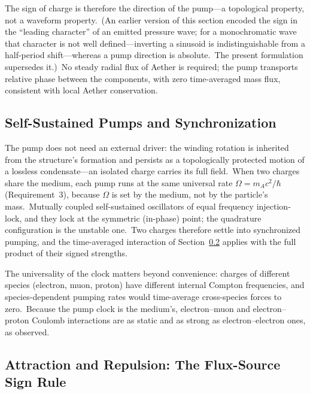 ﻿\documentclass[12pt,letterpaper]{article}
\begin{document}
The sign of charge is therefore the direction of the pump---a topological
property, not a waveform property.\ (An earlier version of this section
encoded the sign in the ``leading character'' of an emitted pressure wave;
for a monochromatic wave that character is not well defined---inverting a
sinusoid is indistinguishable from a half-period shift---whereas a pump
direction is absolute.\ The present formulation supersedes it.)\ No steady
radial flux of Aether is required; the pump transports relative phase
between the components, with zero time-averaged mass flux, consistent with
local Aether conservation.


\subsection{Self-Sustained Pumps and Synchronization}
\label{sec:self-perpetuation}

The pump does not need an external driver: the winding rotation is inherited
from the structure's formation and persists as a topologically protected
motion of a lossless condensate---an isolated charge carries its full
field.\ When two charges share the medium, each pump runs at the same
universal rate $\Omega = m_A c^2/\hbar$ (Requirement~3), because $\Omega$ is
set by the medium, not by the particle's mass.\ Mutually coupled
self-sustained oscillators of equal frequency injection-lock, and they lock
at the symmetric (in-phase) point; the quadrature configuration is the
unstable one.\ Two charges therefore settle into synchronized pumping, and
the time-averaged interaction of
Section~\ref{sec:wave-interference-force} applies with the full product of
their signed strengths.

The universality of the clock matters beyond convenience: charges of
different species (electron, muon, proton) have different internal Compton
frequencies, and species-dependent pumping rates would time-average
cross-species forces to zero.\ Because the pump clock is the medium's,
electron--muon and electron--proton Coulomb interactions are as static and
as strong as electron--electron ones, as observed.


\subsection{Attraction and Repulsion: The Flux-Source Sign Rule}
\label{sec:wave-interference-force}
\end{document}

